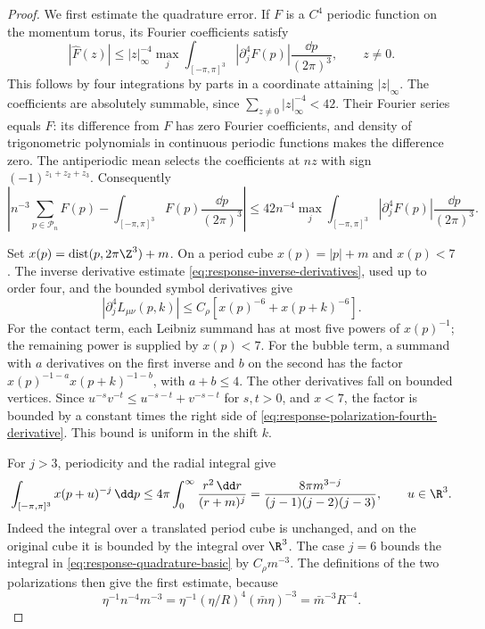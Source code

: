 \documentclass[11pt,letterpaper,reqno]{amsart}
\begin{document}
\begin{proof}
We first estimate the quadrature error. If $F$ is a $C^4$
periodic function on the momentum torus, its Fourier coefficients
satisfy
\[
 |\widehat F(z)|\le |z|_\infty^{-4}
       \max_j\int_{[-\pi,\pi]^3}|\partial_j^4F(p)|
                                      \frac{\dd p}{(2\pi)^3},
                                                \qquad z\ne0.
\]
This follows by four integrations by parts in a coordinate attaining
$|z|_\infty$. The coefficients are absolutely summable, since
$\sum_{z\ne0}|z|_\infty^{-4}<42$. Their Fourier series equals
$F$: its difference from $F$ has zero Fourier coefficients,
and density of trigonometric polynomials in continuous periodic
functions makes the difference zero. The antiperiodic mean
selects the coefficients at $nz$ with sign $(-1)^{z_1+z_2+z_3}$.
Consequently
\begin{equation}\label{eq:response-quadrature-basic}
 \left|n^{-3}\sum_{p\in\mathcal P_n}F(p)
                  -\int_{[-\pi,\pi]^3}F(p)\frac{\dd p}{(2\pi)^3}\right|
 \le42n^{-4}\max_j
        \int_{[-\pi,\pi]^3}|\partial_j^4F(p)|
                                      \frac{\dd p}{(2\pi)^3}.
\end{equation}

Set $x(p)=\operatorname{dist}(p,2\pi\Z^3)+m$. On a period
cube $x(p)=|p|+m$ and $x(p)<7$. The inverse derivative
estimate \eqref{eq:response-inverse-derivatives}, used up
to order four, and the bounded symbol derivatives give
\begin{equation}\label{eq:response-polarization-fourth-derivative}
 |\partial_j^4L_{\mu\nu}(p,k)|
                 \le C_\rho[x(p)^{-6}+x(p+k)^{-6}].
\end{equation}
For the contact term, each Leibniz summand has at most five
powers of $x(p)^{-1}$; the remaining power is supplied by
$x(p)<7$. For the bubble term, a summand with $a$ derivatives
on the first inverse and $b$ on the second has the factor
$x(p)^{-1-a}x(p+k)^{-1-b}$, with $a+b\le4$.
The other derivatives fall on bounded vertices. Since
$u^{-s}v^{-t}\le u^{-s-t}+v^{-s-t}$ for $s,t>0$,
and $x<7$, the factor is bounded by a constant times the
right side of \eqref{eq:response-polarization-fourth-derivative}.
This bound is uniform in the shift $k$.

For $j>3$, periodicity and the radial integral give
\begin{equation}\label{eq:response-translated-integral}
 \int_{[-\pi,\pi]^3}x(p+u)^{-j}\,\dd p
 \le4\pi\int_0^\infty\frac{r^2\,\dd r}{(r+m)^j}
       =\frac{8\pi m^{3-j}}{(j-1)(j-2)(j-3)},
                                             \qquad u\in\R^3.
\end{equation}
Indeed the integral over a translated period cube is unchanged,
and on the original cube it is bounded by the integral over $\R^3$.
The case $j=6$ bounds the integral in
\eqref{eq:response-quadrature-basic} by $C_\rho m^{-3}$.
The definitions of the two polarizations then give the first
estimate, because
\[
 \eta^{-1}n^{-4}m^{-3}
           =\eta^{-1}(\eta/R)^4(\bar m\eta)^{-3}
           =\bar m^{-3}R^{-4}.
\]


\end{proof}
\end{document}
